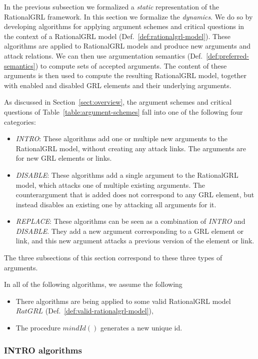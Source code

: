 In the previous subsection we formalized a \emph{static} representation of the RationalGRL framework. In this section we formalize the \emph{dynamics}. We do so by developing algorithms for applying argument schemes and critical questions in the context of a RationalGRL model (Def.~\ref{def:rationalgrl-model}). These algorithms are applied to RationalGRL models and produce new arguments and attack relations. We can then use argumentation semantics (Def.~\ref{def:preferred-semantics}) to compute sets of accepted arguments. The content of these arguments is then used to compute the resulting RationalGRL model, together with enabled and disabled GRL elements and their underlying arguments.

As discussed in Section~\ref{sect:overview}, the argument schemes and critical questions of Table~\ref{table:argument-schemes} fall into one of the following four categories:
\begin{itemize}
\item \emph{INTRO}: These algorithms add one or multiple new arguments to the RationalGRL model, without creating any attack links. The arguments are for new GRL elements or links.
\item \emph{DISABLE}: These algorithms add a single argument to the RationalGRL model, which attacks one of multiple existing arguments. The counterargument that is added does not correspond to any GRL element, but instead disables an existing one by attacking all arguments for it.
\item \emph{REPLACE}: These algorithms can be seen as a combination of \emph{INTRO} and \emph{DISABLE}. They add a new argument corresponding to a GRL element or link, and this new argument attacks a previous version of the element or link. 
\end{itemize}

The three subsections of this section correspond to these three types of arguments.

In all of the following algorithms, we assume the following
\begin{itemize}
\item There algorithms are being applied to some valid RationalGRL model $RatGRL$ (Def.~\ref{def:valid-rationalgrl-model}),
\item The procedure $mindId()$ generates a new unique id.
\end{itemize}

\subsubsection{INTRO algorithms}

